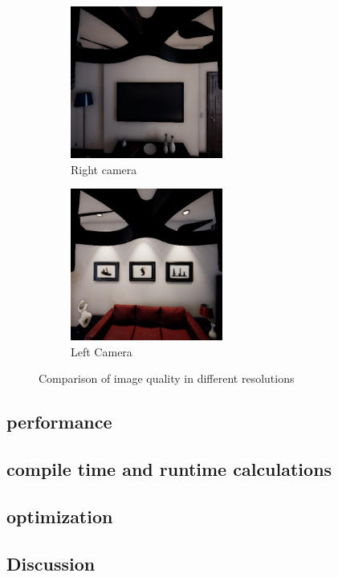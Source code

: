 \begin{figure}[!htb]
\begin{subfigure}{0.32\textwidth}
        \centering
        \includegraphics[height=5cm]{rapport/fig/Results/left_center.jpeg}
        \caption{Right camera}
        \label{fig:res_original_left}
    \end{subfigure}    
    \begin{subfigure}{0.32\textwidth}
        \centering
        \includegraphics[height=5cm]{rapport/fig/Results/right_center.jpeg}
        \caption{Left Camera}
        \label{fig:res_original_right}
    \end{subfigure}
    \centering
    \caption{Comparison of image quality in different resolutions}
    \label{fig:res_original_pictures}
\end{figure}

\subsection{performance}



\subsection{compile time and runtime calculations}



\subsection{optimization}



\subsection{Discussion}

